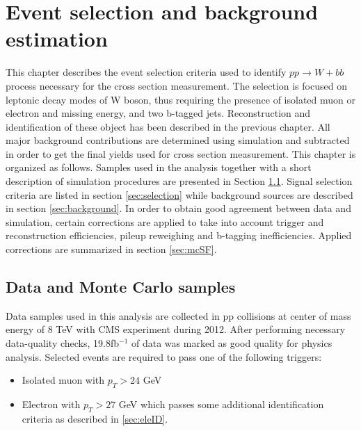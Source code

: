 
\chapter{Event selection and background estimation} %

\label{Chapter6} %


This chapter describes the event selection criteria used to identify $pp\rightarrow W+bb$ process necessary for the cross section measurement. The selection is focused on leptonic decay modes of W boson, thus requiring the presence of isolated muon or electron and missing energy, and two b-tagged jets. Reconstruction and identification of these object has been described in the previous chapter. All major background contributions are determined using simulation and subtracted in order to get the final yields used for cross section measurement. 
This chapter is organized as follows. Samples used in the analysis together with a short description of simulation procedures are presented in Section \ref{sec:samples}. Signal selection criteria are listed in section \ref{sec:selection} while background sources are described in section \ref{sec:background}. In order to obtain good agreement between data and simulation, certain corrections are applied to take into account trigger and reconstruction efficiencies, pileup reweighing and b-tagging inefficiencies. Applied corrections are summarized in section \ref{sec:mcSF}.     

\section{Data and Monte Carlo samples}
\label{sec:samples}
Data samples used in this analysis are collected in pp collisions at center of mass energy of 8 TeV with CMS experiment during 2012. After performing necessary data-quality checks, 19.8fb$^{-1}$ of data was marked as good quality for physics analysis. Selected events are required to pass one of the following triggers:
\begin{itemize}
\item Isolated muon with $p_T>24$ GeV
\item Electron with $p_T>27$ GeV which passes some additional identification criteria as described in \ref{sec:eleID}.
\end{itemize}

